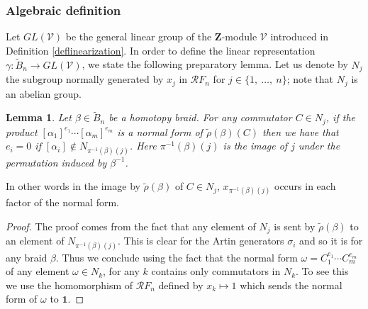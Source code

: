\documentclass[11pt, a4paper, twoside,reqno]{amsart}
\newtheorem{lem}[thm]{Lemma}
\begin{document}
\subsubsection{Algebraic definition}
Let $GL(\mathcal{V})$ be the general linear group of the $\mathbf Z$-module $\mathcal{V}$ introduced in Definition \ref{deflinearization}.
In order to define the linear representation $\gamma:\tilde{B}_n\rightarrow GL(\mathcal{V})$, we state the following preparatory lemma. Let us denote by $N_j$ the subgroup normally generated by $x_j$ in $\mathcal{R}F_n$ for $j\in\{1,\ \ldots,\ n\}$; note that $N_j$ is an abelian group.
\begin{lem}\label{lemgammarpz}
Let $\beta\in\tilde B_n$ be a homotopy braid. For any commutator $C\in N_j$, if the product $[\alpha_1]^{e_1}\cdots [\alpha_m]^{e_m}$ is a normal form of $\tilde{\rho}(\beta)(C)$ then we have that $e_i=0$ if $[\alpha_i]\notin N_{\pi^{-1}(\beta)(j)}$. Here $\pi^{-1}(\beta)(j)$ is the image of $j$ under the permutation induced by $\beta^{-1}$.
\end{lem}
In other words in the image by $\tilde{\rho}(\beta)$ of $C\in N_j$, $x_{\pi^{-1}(\beta)(j)}$ occurs in each factor of the normal form.
\begin{proof}
The proof comes from the fact that any element of $N_j$ is sent by $\tilde\rho(\beta)$ to an element of $N_{\pi^{-1}(\beta)(j)}$. This is clear for the Artin generators $\sigma_i$ and so it is for any braid $\beta$. Thus we conclude using the fact that the normal form $\omega=C_1^{e_1}\cdots C_m^{e_m}$ of any element $\omega\in N_k$, for any $k$ contains only commutators in $N_k$. To see this we use the homomorphism of $\mathcal RF_n$ defined by $x_k \mapsto 1$ which sends the normal form of $\omega$ to $\mathbf1$.
 \end{proof}
\end{document}

